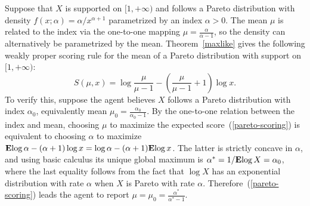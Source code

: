 %
\begin{example}
Suppose that $X$ is supported on $[1,+\infty)$ and follows a Pareto distribution with density $f(x;\alpha) = \alpha/x^{\alpha+1}$ parametrized by an index $\alpha > 0$. The mean $\mu$ is related to the index via the one-to-one mapping $\mu = \frac{\alpha}{\alpha-1}$, so the density can alternatively be parametrized by the mean. Theorem~\ref{maxlike} gives the following weakly proper scoring rule for the mean of a Pareto distribution with support on $[1,+\infty)$:
%
\begin{equation} \label{pareto-scoring}
S(\mu,x) = \log \frac{\mu}{\mu-1} - \left(\frac{\mu}{\mu-1} + 1\right) \log x.
\end{equation}
%
To verify this, suppose the agent believes $X$ follows a Pareto distribution with index $\alpha_0$, equivalently mean $\mu_0 = \frac{\alpha_0}{\alpha_0-1}$. By the one-to-one relation between the index and mean, choosing $\mu$ to maximize the expected score~(\ref{pareto-scoring}) is equivalent to choosing $\alpha$ to maximize $\mathbf{E}{\log \alpha - (\alpha+1)\log x} = \log \alpha - (\alpha+1)\mathbf{E}{\log x}$. The latter is strictly concave in $\alpha$, and using basic calculus its unique global maximum is $\alpha^* = 1/\mathbf{E}{\log X} = \alpha_0$, where the last equality follows from the fact that $\log X$ has an exponential distribution with rate $\alpha$ when $X$ is Pareto with rate $\alpha$. Therefore~(\ref{pareto-scoring}) leads the agent to report $\mu = \mu_0 = \frac{\alpha^*}{\alpha^* - 1}$. 
\end{example}
%

